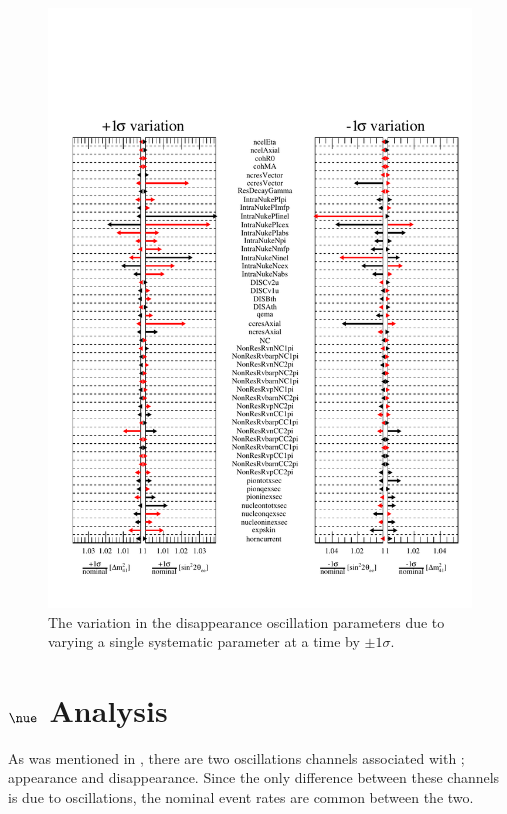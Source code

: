 \begin{figure}[h!]
    \centering
    \includegraphics[width = \largefigwidth]{figures-chap6/star_plot/nue_dsisapp_pulls.pdf}
    \caption[\nue disappearance oscillation parameter pulls due to varying a single systematic parameter by $\pm1\sigma$.]{The variation in the \nue disappearance oscillation parameters due to varying a single systematic parameter at a time by $\pm1\sigma$.}
    \label{fig:nue_disapp_osc_param_pulls}
\end{figure}


\newpage
\section{\texorpdfstring{$\nue$ Analysis}{nue Analysis}}\label{sec:nue_analysis}

As was mentioned in , there are two oscillations channels associated with \nue; \nue appearance and \nue disappearance. Since the only difference between these channels is due to oscillations, the nominal event rates are common between the two. 

